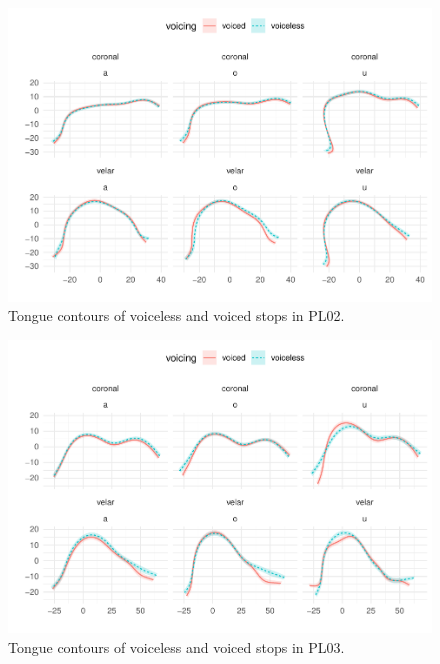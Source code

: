 \documentclass[11pt,]{article}
\begin{document}
\begin{figure}

{\centering \includegraphics[width=.8\textwidth]{2018-polar-gam_files/figure-latex/Figure13} 

}

\caption{Tongue contours of voiceless and voiced stops in PL02.}\label{f:Figure13}
\end{figure}

\begin{figure}

{\centering \includegraphics[width=.8\textwidth]{2018-polar-gam_files/figure-latex/Figure14} 

}

\caption{Tongue contours of voiceless and voiced stops in PL03.}\label{f:Figure14}
\end{figure}
\end{document}
